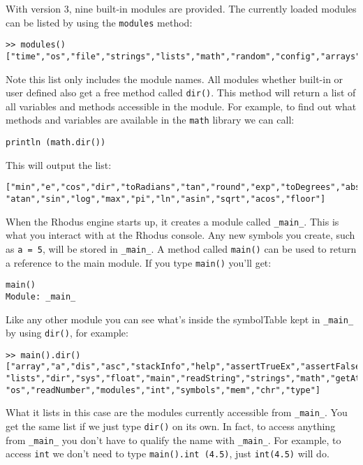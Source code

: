 With version 3, nine built-in modules are provided. The currently loaded modules can be listed by using the {\tt modules{}} method:

\begin{lstlisting}
>> modules()
["time","os","file","strings","lists","math","random","config","arrays"]
\end{lstlisting}

Note this list only includes the module names. All modules whether built-in or user defined also get a free method called {\tt dir()}. This method will return a list of all variables and methods accessible in the module. For example, to find out what methods and variables are available in the {\tt math} library we can call:

\begin{lstlisting}
println (math.dir())
\end{lstlisting}

This will output the list:

\begin{lstlisting}
["min","e","cos","dir","toRadians","tan","round","exp","toDegrees","abs","ceil",
"atan","sin","log","max","pi","ln","asin","sqrt","acos","floor"]
\end{lstlisting}

When the Rhodus engine starts up, it creates a module called {\tt _main_}. This is what you interact with at the Rhodus console. Any new symbols you create, such as {\tt a = 5}, will be stored in {\tt _main_}.  A method called {\tt main()} can be used to return a reference to the main module. If you type {\tt main()} you'll get:

\begin{lstlisting}
main()
Module: _main_
\end{lstlisting}

Like any other module you can see what's inside the symbolTable kept in {\tt _main_} by using {\tt dir()}, for example:

\begin{lstlisting}
>> main().dir()
["array","a","dis","asc","stackInfo","help","assertTrueEx","assertFalseEx",
"lists","dir","sys","float","main","readString","strings","math","getAttr",
"os","readNumber","modules","int","symbols","mem","chr","type"]
\end{lstlisting}

What it lists in this case are the modules currently accessible from {\tt _main_}. You get the same list if we just type {\tt dir()} on its own. In fact, to access anything from {\tt _main_} you don't have to qualify the name with {\tt _main_}. For example, to access {\tt int} we don't need to type {\tt main().int (4.5)}, just {\tt int(4.5)} will do.


